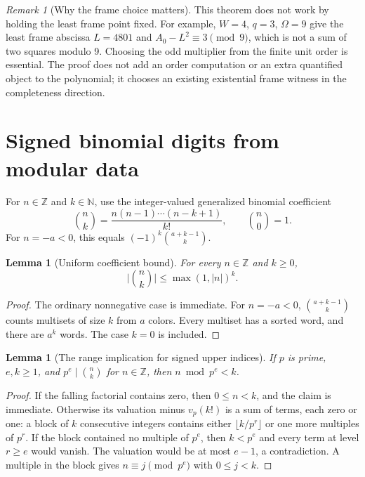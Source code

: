 \documentclass[11pt]{article}
\newtheorem{lemma}[theorem]{Lemma}
\theoremstyle{remark}\newtheorem{remark}[theorem]{Remark}
\newcommand{\Z}{\mathbb Z}\newcommand{\N}{\mathbb N}
\newcommand{\abs}[1]{\lvert #1\rvert}
\begin{document}
\begin{remark}[Why the frame choice matters]
This theorem does not work by holding the least frame point fixed.
For example, $W=4$, $q=3$, $\Omega=9$ give the least frame abscissa
$L=4801$ and $A_0-L^2\equiv3\pmod9$, which is not a sum of two
squares modulo 9. Choosing the odd multiplier from the finite unit
order is essential. The proof does not add an order computation or
an extra quantified object to the polynomial; it chooses an existing
existential frame witness in the completeness direction.
\end{remark}

\section{Signed binomial digits from modular data}

For $n\in\Z$ and $k\in\N$, use the integer-valued generalized
binomial coefficient
\[
 \binom nk=\frac{n(n-1)\cdots(n-k+1)}{k!},\qquad \binom n0=1.
\]
For $n=-a<0$, this equals $(-1)^k\binom{a+k-1}{k}$.

\begin{lemma}[Uniform coefficient bound]\label{lem:signed-bound}
For every $n\in\Z$ and $k\ge0$,
\[
 \abs{\binom nk}\le\max(1,\abs n)^k.
\]
\end{lemma}
\begin{proof}
The ordinary nonnegative case is immediate. For $n=-a<0$,
$\binom{a+k-1}{k}$ counts multisets of size $k$ from $a$ colors.
Every multiset has a sorted word, and there are $a^k$ words. The
case $k=0$ is included.
\end{proof}

\begin{lemma}[The range implication for signed upper indices]\label{lem:signed-range}
If $p$ is prime, $e,k\ge1$, and $p^e\mid\binom nk$ for
$n\in\Z$, then $n\bmod p^e<k$.
\end{lemma}
\begin{proof}
If the falling factorial contains zero, then $0\le n<k$, and the
claim is immediate. Otherwise its valuation minus $v_p(k!)$ is a
sum of terms, each zero or one: a block of $k$ consecutive integers
contains either $\lfloor k/p^r\rfloor$ or one more multiples of
$p^r$. If the block contained no multiple of $p^e$, then $k<p^e$
and every term at level $r\ge e$ would vanish. The valuation would
be at most $e-1$, a contradiction. A multiple in the block gives
$n\equiv j\pmod{p^e}$ with $0\le j<k$.
\end{proof}
\end{document}
